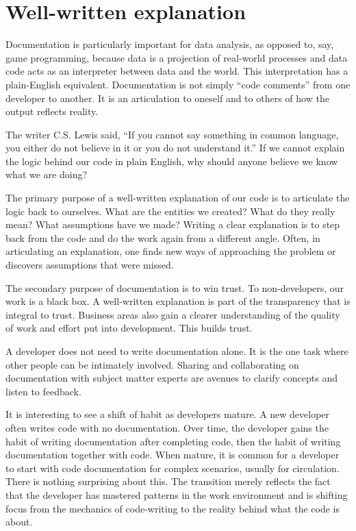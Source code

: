\documentclass[10pt,openany,10pt]{book}
\begin{document}
\section{Well-written explanation}\label{well-written-explanation}

Documentation is particularly important for data analysis, as opposed
to, say, game programming, because data is a projection of real-world
processes and data code acts as an interpreter between data and the
world. This interpretation has a plain-English equivalent. Documentation
is not simply ``code comments'' from one developer to another. It is an
articulation to oneself and to others of how the output reflects
reality.

The writer C.S. Lewis said, ``If you cannot say something in common
language, you either do not believe in it or you do not understand it.''
If we cannot explain the logic behind our code in plain English, why
should anyone believe we know what we are doing?

The primary purpose of a well-written explanation of our code is to
articulate the logic back to ourselves. What are the entities we
created? What do they really mean? What assumptions have we made?
Writing a clear explanation is to step back from the code and do the
work again from a different angle. Often, in articulating an
explanation, one finds new ways of approaching the problem or discovers
assumptions that were missed.

The secondary purpose of documentation is to win trust. To
non-developers, our work is a black box. A well-written explanation is
part of the transparency that is integral to trust. Business areas also
gain a clearer understanding of the quality of work and effort put into
development. This builds trust.

A developer does not need to write documentation alone. It is the one
task where other people can be intimately involved. Sharing and
collaborating on documentation with subject matter experts are avenues
to clarify concepts and listen to feedback.

It is interesting to see a shift of habit as developers mature. A new
developer often writes code with no documentation. Over time, the
developer gains the habit of writing documentation after completing
code, then the habit of writing documentation together with code. When
mature, it is common for a developer to start with code documentation
for complex scenarios, usually for circulation. There is nothing
surprising about this. The transition merely reflects the fact that the
developer has mastered patterns in the work environment and is shifting
focus from the mechanics of code-writing to the reality behind what the
code is about.
\end{document}
